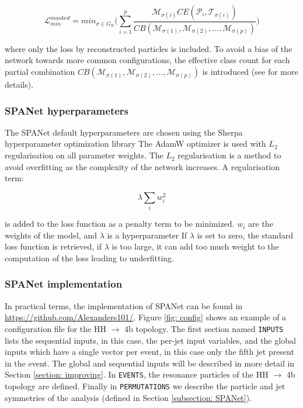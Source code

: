 \begin{equation}
    \mathcal{L}_{min}^{masked}=min_{\sigma \in G_E}\bigg( \sum_{i=1}^p \frac{\mathcal{M}_{\sigma(i)} CE(\mathcal{P}_i, \mathcal{T}_{\sigma(i)})}{CB(\mathcal{M}_{\sigma(1)}, \mathcal{M}_{\sigma(2)}, ..., \mathcal{M}_{\sigma(p)})}\bigg)
\end{equation}

\noindent where only the loss by reconstructed particles is included.  To avoid a bias of the network towards more common configurations, the effective class count for each partial combination $CB(\mathcal{M}_{\sigma(1)}, \mathcal{M}_{\sigma(2)}, ..., \mathcal{M}_{\sigma(p)})$ is introduced (see \cite{SPANet} for more details).

\subsubsection{SPANet hyperparameters}

The SPANet default hyperparameters are chosen using the Sherpa hyperparameter optimization library \cite{Sherpa} The AdamW optimizer \cite{AdamW} is used with $L_2$ regularisation on all parameter weights. The $L_2$ regularisation is a method to avoid overfitting as the complexity of the network increases. A regularisation term:

\begin{equation}
    \lambda \sum_i w^2_i
\end{equation}

\noindent is added to the loss function as a penalty term to be minimized. $w_i$ are the weights of the model, and $\lambda$ is a hyperparameter 
If $\lambda$ is set to zero,  the standard loss function is retrieved, if $\lambda$ is too large, it can add too much weight to the computation of the loss leading to underfitting.


\subsubsection{SPANet implementation}

In practical terms, the implementation of SPANet can be found in  \url{https://github.com/Alexanders101/}. Figure \ref{fig: config} shows an example of a configuration file for the HH $\to$ 4b topology. The first section named \verb|INPUTS| lists the sequential inputs, in this case, the per-jet input variables, and the global inputs which have a single vector per event, in this case only the fifth jet present in the event. The global and sequential inputs will be described in more detail in Section \ref{section: improving}. In \verb|EVENTS|, the resonance particles of the HH $\to$ 4b topology are defined. Finally in \verb|PERMUTATIONS| we describe the particle and jet symmetries of the analysis (defined in Section \ref{subsection: SPANet}).

